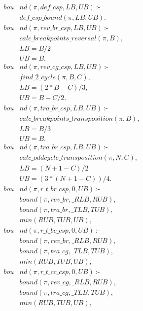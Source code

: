 \begin{align}
  \label{bound}
  \textit{bou}&\textit{nd}(\pi, def\_csp, LB, UB)~\text{:-} \nonumber\\
  &\textit{def\_csp\_bound}(\pi, LB, UB). \nonumber \\
  \textit{bou}&\textit{nd}(\pi, rev\_br\_csp, LB, UB)~\text{:-} \nonumber \\
  &\textit{calc\_breakpoints\_reversal}(\pi, B), \nonumber\\
  &LB = B / 2 \nonumber \\ %
  &UB = B. \nonumber \\
  \textit{bou}&\textit{nd}(\pi, rev\_cg\_csp, LB, UB)~\text{:-} \nonumber \\
  &\textit{find\_2\_cycle}(\pi, B, C), \nonumber\\
  &LB = (2 * B - C) / 3 , \nonumber  \\
  &UB = B - C / 2. \nonumber \\
  \textit{bou}&\textit{nd}(\pi, tra\_br\_csp, LB, UB)~\text{:-} \nonumber\\
  &\textit{calc\_breakpoints\_transposition}(\pi, B), \nonumber\\
  &LB = B / 3 \nonumber \\ %
  &UB = B.  \nonumber \\
  \textit{bou}&\textit{nd}(\pi, tra\_br\_csp, LB, UB)~\text{:-} \\
  &\textit{calc\_oddcycle\_transposition}(\pi, N, C), \nonumber\\
  &LB = (N + 1 - C) / 2 \nonumber \\ 
  &UB = (3 * (N + 1 - C)) / 4. \nonumber \\
  \textit{bou}&\textit{nd}(\pi, r\_t\_br\_csp, 0, UB)~\text{:-} \nonumber\\
  &\textit{bound}(\pi, rev\_br, \_RLB, RUB), \nonumber\\
  &\textit{bound}(\pi, tra\_br, \_TLB, TUB), \nonumber\\
  &\textit{min}(RUB, TUB, UB), \nonumber\\
  \textit{bou}&\textit{nd}(\pi, r\_t\_bc\_csp, 0, UB)~\text{:-} \nonumber\\
  &\textit{bound}(\pi, rev\_br, \_RLB, RUB), \nonumber\\
  &\textit{bound}(\pi, tra\_cg, \_TLB, TUB), \nonumber\\
  &\textit{min}(RUB, TUB, UB), \nonumber\\
  \textit{bou}&\textit{nd}(\pi, r\_t\_cc\_csp, 0, UB)~\text{:-} \nonumber\\
  &\textit{bound}(\pi, rev\_cg, \_RLB, RUB), \nonumber\\
  &\textit{bound}(\pi, tra\_cg, \_TLB, TUB), \nonumber\\
  &\textit{min}(RUB, TUB, UB), \nonumber
\end{align}

